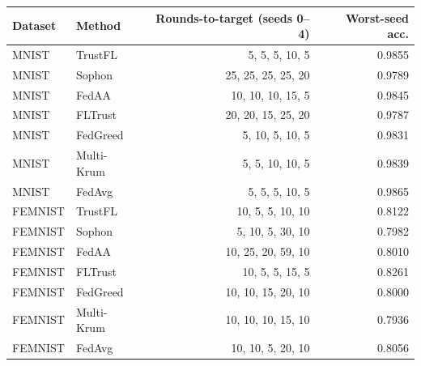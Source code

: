 \begin{tabular}{llrr}
\toprule
Dataset & Method & Rounds-to-target (seeds 0--4) & Worst-seed acc. \\
\midrule
MNIST & TrustFL & 5, 5, 5, 10, 5 & 0.9855 \\
MNIST & Sophon & 25, 25, 25, 25, 20 & 0.9789 \\
MNIST & FedAA & 10, 10, 10, 15, 5 & 0.9845 \\
MNIST & FLTrust & 20, 20, 15, 25, 20 & 0.9787 \\
MNIST & FedGreed & 5, 10, 5, 10, 5 & 0.9831 \\
MNIST & Multi-Krum & 5, 5, 10, 10, 5 & 0.9839 \\
MNIST & FedAvg & 5, 5, 5, 10, 5 & 0.9865 \\
FEMNIST & TrustFL & 10, 5, 5, 10, 10 & 0.8122 \\
FEMNIST & Sophon & 5, 10, 5, 30, 10 & 0.7982 \\
FEMNIST & FedAA & 10, 25, 20, 59, 10 & 0.8010 \\
FEMNIST & FLTrust & 10, 5, 5, 15, 5 & 0.8261 \\
FEMNIST & FedGreed & 10, 10, 15, 20, 10 & 0.8000 \\
FEMNIST & Multi-Krum & 10, 10, 10, 15, 10 & 0.7936 \\
FEMNIST & FedAvg & 10, 10, 5, 20, 10 & 0.8056 \\
\bottomrule
\end{tabular}
